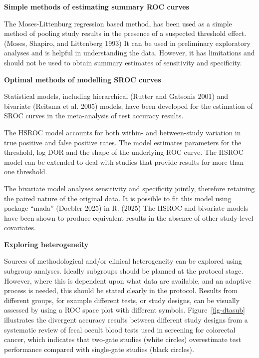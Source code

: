 \documentclass[
  11pt,
  a4paper,
  DIV=11,
  numbers=noendperiod]{scrreprt}
\begin{document}
\textbf{Simple methods of estimating summary ROC curves}

The Moses-Littenburg regression based method, has been used as a simple
method of pooling study results in the presence of a suspected threshold
effect. (Moses, Shapiro, and Littenberg 1993) It can be used in
preliminary exploratory analyses and is helpful in understanding the
data. However, it has limitations and should not be used to obtain
summary estimates of sensitivity and specificity.

\textbf{Optimal methods of modelling SROC curves}

Statistical models, including hierarchical (Rutter and Gatsonis 2001)
and bivariate (Reitsma et al. 2005) models, have been developed for the
estimation of SROC curves in the meta-analysis of test accuracy results.

The HSROC model accounts for both within- and between-study variation in
true positive and false positive rates. The model estimates parameters
for the threshold, log DOR and the shape of the underlying ROC curve.
The HSROC model can be extended to deal with studies that provide
results for more than one threshold.

The bivariate model analyses sensitivity and specificity jointly,
therefore retaining the paired nature of the original data. It is
possible to fit this model using package ``mada'' (Doebler 2025) in R.
(2025) The HSROC and bivariate models have been shown to produce
equivalent results in the absence of other study-level covariates.

\textbf{Exploring heterogeneity}

Sources of methodological and/or clinical heterogeneity can be explored
using subgroup analyses. Ideally subgroups should be planned at the
protocol stage. However, where this is dependent upon what data are
available, and an adaptive process is needed, this should be stated
clearly in the protocol. Results from different groups, for example
different tests, or study designs, can be visually assessed by using a
ROC space plot with different symbols. Figure~\ref{fig-dtasub}
illustrates the divergent accuracy results between different study
designs from a systematic review of fecal occult blood tests used in
screening for colorectal cancer, which indicates that two-gate studies
(white circles) overestimate test performance compared with single-gate
studies (black circles).
\end{document}
